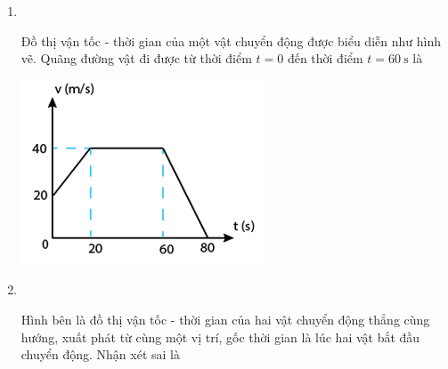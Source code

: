 \begin{enumerate}[label=\bfseries Câu \arabic*:]
\item {}\\
{\begin{minipage}[l]{0.7\textwidth}
		Đồ thị vận tốc - thời gian của một vật chuyển động được biểu diễn như hình vẽ. Quãng đường vật đi được từ thời điểm $t = 0$ đến thời điểm $t = \SI{60}{\second}$ là
	\end{minipage}
	\begin{minipage}{0.3\textwidth}
		\begin{center}
			\includegraphics[width=1.0\linewidth]{../figs/VN10-2022-PH-TP008-P-5}
		\end{center}
	\end{minipage}
}
\item {}\\
{\begin{minipage}[l]{0.7\textwidth}
		Hình bên là đồ thị vận tốc - thời gian của hai vật chuyển động thẳng cùng hướng, xuất phát từ cùng một vị trí, gốc thời gian là lúc hai vật bắt đầu chuyển động. Nhận xét sai là
\end{minipage}}
\end{enumerate}
